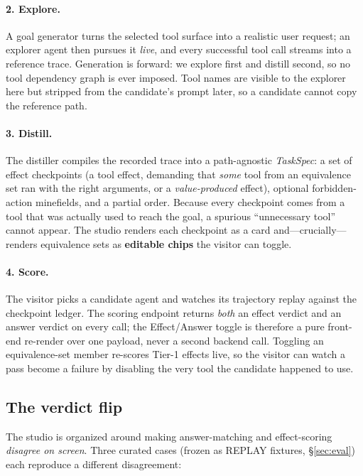 \documentclass[11pt]{article}
\begin{document}
\paragraph{2. Explore.} A goal generator turns the selected tool surface into a
realistic user request; an explorer agent then pursues it \emph{live}, and every
successful tool call streams into a reference trace. Generation is forward: we
explore first and distill second, so no tool dependency graph is ever imposed.
Tool names are visible to the explorer here but stripped from the candidate's
prompt later, so a candidate cannot copy the reference path.

\paragraph{3. Distill.} The distiller compiles the recorded trace into a
path-agnostic \emph{TaskSpec}: a set of effect checkpoints (a tool effect,
demanding that \emph{some} tool from an equivalence set ran with the right
arguments, or a \emph{value-produced} effect), optional forbidden-action
minefields, and a partial order. Because every checkpoint comes from a tool that
was actually used to reach the goal, a spurious ``unnecessary tool'' cannot
appear. The studio renders each checkpoint as a card and---crucially---renders
equivalence sets as \textbf{editable chips} the visitor can toggle.

\paragraph{4. Score.} The visitor picks a candidate agent and watches its
trajectory replay against the checkpoint ledger. The scoring endpoint returns
\emph{both} an effect verdict and an answer verdict on every call; the
Effect/Answer toggle is therefore a pure front-end re-render over one payload,
never a second backend call. Toggling an equivalence-set member re-scores Tier-1
effects live, so the visitor can watch a pass become a failure by disabling the
very tool the candidate happened to use.

\subsection{The verdict flip}

The studio is organized around making answer-matching and effect-scoring
\emph{disagree on screen}. Three curated cases (frozen as REPLAY fixtures,
\S\ref{sec:eval}) each reproduce a different disagreement:
\end{document}
